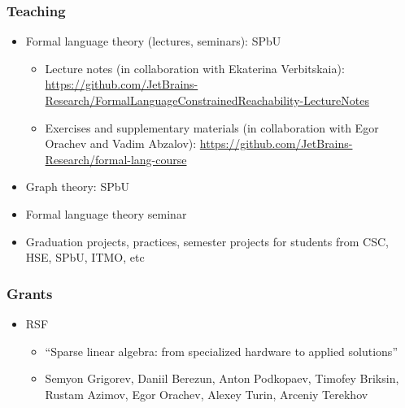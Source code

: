 \documentclass[xcolor=table, aspectratio=169]{beamer}
\begin{document}
\begin{frame}[fragile]

  \frametitle{Teaching}
\begin{itemize}
      \item Formal language theory (lectures, seminars): SPbU
        \begin{itemize}
          \item [\faGears] Lecture notes (in collaboration with Ekaterina Verbitskaia): \url{https://github.com/JetBrains-Research/FormalLanguageConstrainedReachability-LectureNotes} 
          \item [\faGears] Exercises and supplementary materials (in collaboration with Egor Orachev and Vadim Abzalov): \url{https://github.com/JetBrains-Research/formal-lang-course}
        \end{itemize}
      \item Graph theory: SPbU
      \item Formal language theory seminar
      \item Graduation projects, practices, semester projects for students from CSC, HSE, SPbU, ITMO, etc
\end{itemize}
\end{frame}

\begin{frame}[fragile]

  \frametitle{Grants}
\begin{itemize}
      \item[\faTimes] RSF 
      \begin{itemize}
        \item ``Sparse linear algebra: from specialized hardware to applied solutions''
        \item Semyon Grigorev, Daniil Berezun, Anton Podkopaev, Timofey Briksin, Rustam Azimov, Egor Orachev, Alexey Turin, Arceniy Terekhov
      \end{itemize}
\end{itemize}
\end{frame}
\end{document}
